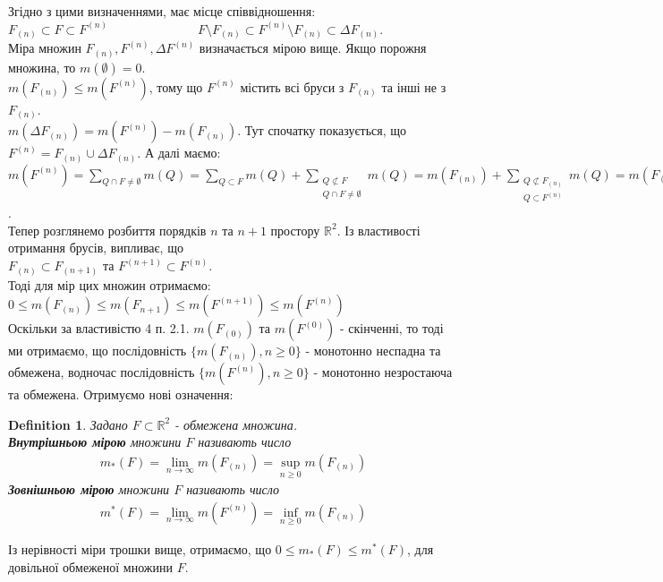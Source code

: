 \documentclass[a4paper, 10pt]{article}
\theoremstyle{theoremdd}
\theoremstyle{theoremdd}
\newtheorem{definition}[theorem]{Definition}
\theoremstyle{theoremdd}
\theoremstyle{theoremdd}
\theoremstyle{theoremdd}
\theoremstyle{theoremdd}
\theoremstyle{theoremdd}
\theoremstyle{theoremdd}
\begin{document}
Згідно з цими визначеннями, має місце співвідношення:\\
$F_{(n)} \subset F \subset F^{(n)} \hspace{3cm} F \setminus F_{(n)} \subset F^{(n)} \setminus F_{(n)} \subset \Delta F_{(n)}$.\\
Міра множин $F_{(n)}, F^{(n)}, \Delta F^{(n)}$ визначається мірою вище. Якщо порожня множина, то $m(\emptyset) = 0$.\\
$m(F_{(n)}) \leq m(F^{(n)})$, тому що $F^{(n)}$ містить всі бруси з $F_{(n)}$ та інші не з $F_{(n)}$.\\
$m(\Delta F_{(n)}) = m(F^{(n)}) - m(F_{(n)})$. Тут спочатку показується, що $F^{(n)} = F_{(n)} \cup \Delta F_{(n)}$. А далі маємо:\\
$m(F^{(n)}) = \displaystyle\sum_{Q \cap F \neq \emptyset} m(Q) = \sum_{Q \subset F} m(Q) + \sum_{\substack{Q \not\subset F \\ Q \cap F \neq \emptyset}} m(Q) = m(F_{(n)}) + \sum_{\substack{Q \not\subset F_{(n)} \\ Q \subset F^{(n)}}} m(Q) = m(F_{(n)}) + m(\Delta F_{(n)})$.
\bigskip \\
Тепер розглянемо розбиття порядків $n$ та $n+1$ простору $\mathbb{R}^2$. Із властивості отримання брусів, випливає, що\\
$F_{(n)} \subset F_{(n+1)}$ та $F^{(n+1)} \subset F^{(n)}$.\\
Тоді для мір цих множин отримаємо:\\
$0 \leq m(F_{(n)}) \leq m(F_{n+1}) \leq m(F^{(n+1)}) \leq m(F^{(n)})$\\
Оскільки за властивістю 4 п. 2.1. $m(F_{(0)})$ та $m(F^{(0)})$ - скінченні, то тоді ми отримаємо, що послідовність $\{m(F_{(n)}), n \geq 0\}$ - монотонно неспадна та обмежена, водночас послідовність $\{m(F^{(n)}), n \geq 0\}$ - монотонно незростаюча та обмежена. Отримуємо нові означення:

\begin{definition}
Задано $F \subset \mathbb{R}^2$ - обмежена множина.\\
\textbf{Внутрішньою мірою} множини $F$ називають число
\begin{align*}
m_*(F) = \lim_{n \to \infty} m(F_{(n)}) = \sup_{n \geq 0} m(F_{(n)})
\end{align*}
\textbf{Зовнішньою мірою} множини $F$ називають число
\begin{align*}
m^*(F) = \lim_{n \to \infty} m(F^{(n)}) = \inf_{n \geq 0} m(F_{(n)})
\end{align*}
\end{definition}
Із нерівності міри трошки вище, отримаємо, що $0 \leq m_*(F) \leq m^*(F)$, для довільної обмеженої множини $F$.
\end{document}

